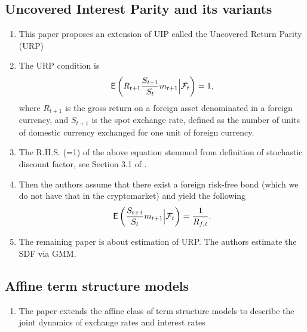 \documentclass[square]{article} %
\theoremstyle{plain}
\theoremstyle{definition} %
\begin{document}
\subsection{Uncovered Interest Parity and its variants}
\cite{cappiello2007uncovered}
\begin{enumerate}
  \item This paper proposes an extension of UIP called the Uncovered Return Parity (URP)
  \item The URP condition is 
  \begin{align*}
    \mathbb{\sf E}\left(R_{t+1}\frac{S_{t+1}}{S_t}m_{t+1}\Big|\mathcal{F}_t\right)=1,
  \end{align*}
  where $R_{t+1}$ is the gross return on a foreign asset denominated in a foreign currency, and $S_{t+1}$ is the spot exchange rate, defined as the number of units of domestic currency exchanged for one unit of foreign currency. 
  \item The R.H.S. (=1) of the above equation stemmed from definition of stochastic discount factor, see Section 3.1 of \cite{back2010asset}. 
  \item Then the authors assume that there exist a foreign risk-free bond (which we do not have that in the cryptomarket) and yield the following
  \begin{align*}
    \mathbb{\sf E}\left(\frac{S_{t+1}}{S_t}m_{t+1}\Big|\mathcal{F}_t\right) = \frac{1}{R_{f,t}}.
  \end{align*}
  \item The remaining paper is about estimation of URP. The authors estimate the SDF via GMM. 
\end{enumerate}

\subsection{Affine term structure models}
\cite{anderson2010affine}
\begin{enumerate}
  \item The paper extends the affine class of term structure models to describe the joint dynamics of exchange rates and interest rates
\end{enumerate}
\end{document}
